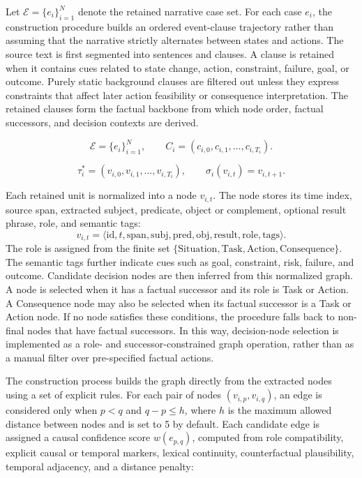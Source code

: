 \documentclass[pdflatex,sn-mathphys-num]{sn-jnl}%
\theoremstyle{thmstyleone}%
\theoremstyle{thmstyletwo}%
\theoremstyle{thmstylethree}%
\begin{document}
Let $\mathcal{E}=\{e_i\}_{i=1}^{N}$ denote the retained narrative case set. For each case $e_i$, the construction procedure builds an ordered event-clause trajectory rather than assuming that the narrative strictly alternates between states and actions. The source text is first segmented into sentences and clauses. A clause is retained when it contains cues related to state change, action, constraint, failure, goal, or outcome. Purely static background clauses are filtered out unless they express constraints that affect later action feasibility or consequence interpretation. The retained clauses form the factual backbone from which node order, factual successors, and decision contexts are derived.

\begin{equation}
\mathcal{E}=\{e_i\}_{i=1}^{N},\qquad
C_i=(c_{i,0},c_{i,1},\ldots,c_{i,T_i}).
\end{equation}


\begin{equation}
\tau_i^{*}=(v_{i,0},v_{i,1},\ldots,v_{i,T_i}),\qquad
\sigma_i(v_{i,t})=v_{i,t+1}.
\end{equation}

Each retained unit is normalized into a node $v_{i,t}$. The node stores its time index, source span, extracted subject, predicate, object or complement, optional result phrase, role, and semantic tags:
\begin{equation}
v_{i,t}=\langle \mathrm{id},t,\mathrm{span},\mathrm{subj},\mathrm{pred},\mathrm{obj},\mathrm{result},\mathrm{role},\mathrm{tags}\rangle .
\end{equation}
The role is assigned from the finite set $\{\mathrm{Situation},\mathrm{Task},\mathrm{Action},\mathrm{Consequence}\}$. The semantic tags further indicate cues such as goal, constraint, risk, failure, and outcome. Candidate decision nodes are then inferred from this normalized graph. A node is selected when it has a factual successor and its role is Task or Action. A Consequence node may also be selected when its factual successor is a Task or Action node. If no node satisfies these conditions, the procedure falls back to non-final nodes that have factual successors. In this way, decision-node selection is implemented as a role- and successor-constrained graph operation, rather than as a manual filter over pre-specified factual actions.

The construction process builds the graph directly from the extracted nodes using a set of explicit rules. For each pair of nodes $(v_{i,p}, v_{i,q})$, an edge is considered only when $p < q$ and $q-p \leq h$, where $h$ is the maximum allowed distance between nodes and is set to 5 by default. Each candidate edge is assigned a causal confidence score $w(e_{p,q})$, computed from role compatibility, explicit causal or temporal markers, lexical continuity, counterfactual plausibility, temporal adjacency, and a distance penalty:
\end{document}
